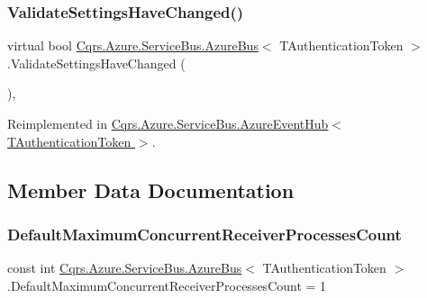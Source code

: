 \subsubsection{\texorpdfstring{Validate\+Settings\+Have\+Changed()}{ValidateSettingsHaveChanged()}}
{\footnotesize\ttfamily virtual bool \hyperlink{classCqrs_1_1Azure_1_1ServiceBus_1_1AzureBus}{Cqrs.\+Azure.\+Service\+Bus.\+Azure\+Bus}$<$ T\+Authentication\+Token $>$.Validate\+Settings\+Have\+Changed (\begin{DoxyParamCaption}{ }\end{DoxyParamCaption})\hspace{0.3cm}{\ttfamily [protected]}, {\ttfamily [virtual]}}



Reimplemented in \hyperlink{classCqrs_1_1Azure_1_1ServiceBus_1_1AzureEventHub_afe8d6f93f97ab5658b81903af555632c_afe8d6f93f97ab5658b81903af555632c}{Cqrs.\+Azure.\+Service\+Bus.\+Azure\+Event\+Hub$<$ T\+Authentication\+Token $>$}.



\subsection{Member Data Documentation}
\mbox{\label{classCqrs_1_1Azure_1_1ServiceBus_1_1AzureBus_a12c3d07b7ad1836e85a449e6adc8b5df_a12c3d07b7ad1836e85a449e6adc8b5df}} 
\subsubsection{\texorpdfstring{Default\+Maximum\+Concurrent\+Receiver\+Processes\+Count}{DefaultMaximumConcurrentReceiverProcessesCount}}
{\footnotesize\ttfamily const int \hyperlink{classCqrs_1_1Azure_1_1ServiceBus_1_1AzureBus}{Cqrs.\+Azure.\+Service\+Bus.\+Azure\+Bus}$<$ T\+Authentication\+Token $>$.Default\+Maximum\+Concurrent\+Receiver\+Processes\+Count = 1\hspace{0.3cm}{\ttfamily [protected]}}

